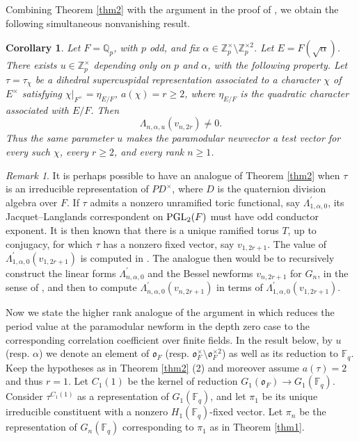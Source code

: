 \documentclass[12pt]{amsart}
\newtheorem{corollary}[theorem]{Corollary}%
\theoremstyle{definition}
\theoremstyle{remark}
\newtheorem{remark}{Remark}
\begin{document}
Combining Theorem \ref{thm2} with the argument in the proof of \cite[Corollary 7.2(i)]{bhko24}, we obtain the following simultaneous nonvanishing result.

\begin{corollary}
Let $F=\mathbb Q_p$, with $p$ odd, and fix $\alpha\in\mathbb Z_p^\times \setminus \mathbb Z_p^{\times 2}$. Let $E=F(\sqrt\alpha)$. There exists $u \in\mathbb Z_p^\times$ depending only on $p$ and $\alpha$, with the following property. Let $\tau=\tau_\chi$ be a dihedral supercuspidal representation associated to a character $\chi$ of $E^\times$ satisfying
$\chi|_{F^\times}=\eta_{E/F}$, $a(\chi)=r\ge2$,
where $\eta_{E/F}$ is the quadratic character associated with $E/F$.
Then
\[
\Lambda_{n,\alpha,u}(v_{n,2r})\ne0.
\]
Thus the same parameter $u$ makes the paramodular newvector a test vector for every such $\chi$, every $r\ge2$, and every rank $n \geq 1$.
\end{corollary}

\begin{remark}
It is perhaps possible to have an analogue of Theorem \ref{thm2} when $\tau$ is an irreducible representation of $PD^\times$, where $D$ is the quaternion division algebra over $F$. If $\tau$ admits a nonzero unramified toric functional, say $\Lambda^\prime_{1,\alpha,0}$, its Jacquet–Langlands correspondent on ${\rm PGL}_2(F)$  must have odd conductor exponent. It is then known that there is a unique ramified torus $T$, up to conjugacy, for which $\tau$ has a nonzero fixed vector, say $v_{1,2r+1}$. The value of $\Lambda^\prime_{1,\alpha,0}(v_{1,2r+1})$ is computed in \cite{ap24}. The analogue then would be to recursively construct the linear forms $\Lambda^\prime_{n,\alpha,0}$  and the Bessel newforms $v_{n,2r+1}$ for $G_n$, in the sense of  \cite{oka21}, and then to compute $\Lambda^\prime_{n,\alpha,0}(v_{n,2r+1})$ in terms of $\Lambda^\prime_{1,\alpha,0}(v_{1,2r+1})$.
\end{remark}

Now we state the higher rank analogue of the argument in \cite[pp. 85-86]{vat23} which reduces the period value at the paramodular newform in the depth zero case to the corresponding correlation coefficient over finite fields. In the result below, by $u$ (resp. $\alpha$) we denote an element of $\mathfrak o_F$ (resp. $\mathfrak o_F^\times \setminus \mathfrak o_F^{\times 2}$) as well as its reduction to $\mathbb F_q$. Keep the hypotheses as in Theorem \ref{thm2} (2) and moreover assume $a(\tau)=2$ and thus $r=1$. Let $C_1(1)$ be the kernel of reduction $G_1(\mathfrak o_F) \to G_1(\mathbb F_q)$. Consider $\tau^{C_1(1)}$ as a representation of $G_1(\mathbb F_q)$, and let $\pi_1$ be its unique irreducible constituent with a nonzero $H_1(\mathbb F_q)$-fixed vector.
Let $\pi_n$ be the representation of $G_n(\mathbb F_q)$ corresponding to $\pi_1$ as in Theorem \ref{thm1}. 
\end{document}
